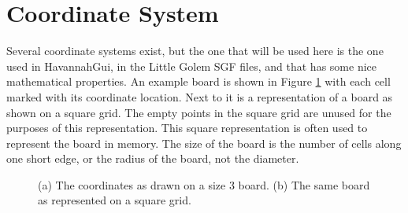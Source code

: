 \section{Coordinate System}

Several coordinate systems exist, but the one that will be used here is the one used in HavannahGui, in the Little Golem SGF files, and that has some nice mathematical properties. An example board is shown in Figure \ref{fig:coordinates} with each cell marked with its coordinate location. Next to it is a representation of a board as shown on a square grid. The empty points in the square grid are unused for the purposes of this representation. This square representation is often used to represent the board in memory. The size of the board is the number of cells along one short edge, or the radius of the board, not the diameter.

\begin{figure}
\centering

\caption{(a) The coordinates as drawn on a size 3 board. (b) The same board as represented on a square grid.}
\label{fig:coordinates}
\end{figure}

